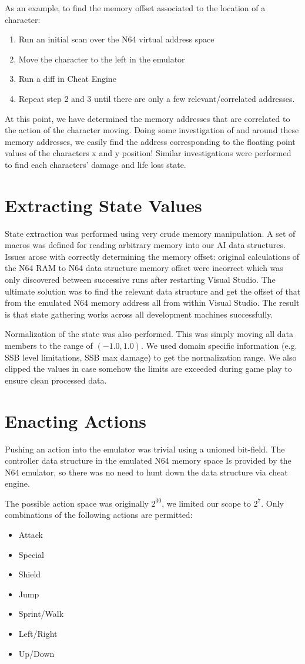 As an example, to find the memory offset associated to the location of a character:
\begin{enumerate}
\item Run an initial scan over the N64 virtual address space
\item Move the character to the left in the emulator
\item Run a diff in Cheat Engine
\item Repeat step 2 and 3 until there are only a few relevant/correlated addresses.
\end{enumerate}
At this point, we have determined the memory addresses that are correlated to the action of the character moving.
Doing some investigation of and around these memory addresses, we easily find the address corresponding to the floating point values of the characters x and y position!
Similar investigations were performed to find each characters' damage and life loss state.

\section*{Extracting State Values}

State extraction was performed using very crude memory manipulation.
A set of macros was defined for reading arbitrary memory into our AI data structures.
Issues arose with correctly determining the memory offset: original calculations of the N64 RAM to N64 data structure memory offset were incorrect which was only discovered between successive runs after restarting Visual Studio.
The ultimate solution was to find the relevant data structure and get the offset of that from the emulated N64 memory address all from within Visual Studio.
The result is that state gathering works across all development machines successfully.

Normalization of the state was also performed.
This was simply moving all data members to the range of $(-1.0, 1.0)$.
We used domain specific information (e.g. SSB level limitations, SSB max damage) to get the normalization range.
We also clipped the values in case somehow the limits are exceeded during game play to ensure clean processed data.

\section*{Enacting Actions}

Pushing an action into the emulator was trivial using a unioned bit-field.
The controller data structure in the emulated N64 memory space Is provided by the N64 emulator, so there was no need to hunt down the data structure via cheat engine.

The possible action space was originally $2^{30}$, we limited our scope to $2^7$. 
Only combinations of the following actions are permitted:
\begin{itemize}
  \item Attack
  \item Special
  \item Shield
  \item Jump
  \item Sprint/Walk
  \item Left/Right
  \item Up/Down
\end{itemize}
